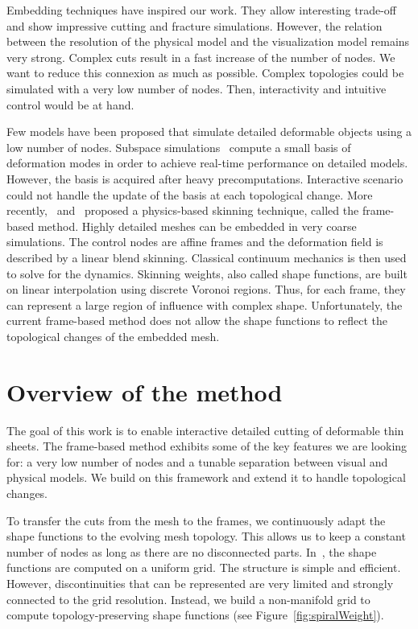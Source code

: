Embedding techniques have inspired our work. They allow interesting trade-off and show impressive cutting and fracture simulations. However, the relation between the resolution of the physical model and the visualization model remains very strong. Complex cuts result in a fast increase of the number of nodes. We want to reduce this connexion as much as possible. Complex topologies could be simulated with a very low number of nodes. Then, interactivity and intuitive control would be at hand.

Few models have been proposed that simulate detailed deformable objects using a low number of nodes. 
Subspace simulations~\cite{Barbic:2005:RTSI} compute a small basis of deformation modes in order to achieve real-time performance on detailed models. 
However, the basis is acquired after heavy precomputations. 
Interactive scenario could not handle the update of the basis at each topological change. 
More recently,~\cite{Gilles2011} and~\cite{Faure2011} proposed a physics-based skinning technique, called the frame-based method. 
Highly detailed meshes can be embedded in very coarse simulations. 
The control nodes are affine frames and the deformation field is described by a linear blend skinning. 
Classical continuum mechanics is then used to solve for the dynamics. 
Skinning weights, also called shape functions, are built on linear interpolation using discrete Voronoi regions. 
Thus, for each frame, they can represent a large region of influence with complex shape. 
Unfortunately, the current frame-based method does not allow the shape functions to reflect the topological changes of the embedded mesh.

\section{Overview of the method}

The goal of this work is to enable interactive detailed cutting of deformable thin sheets. 
The frame-based method exhibits some of the key features we are looking for: a very low number of nodes and a tunable separation between visual and physical models.  
We build on this framework and extend it to handle topological changes.

To transfer the cuts from the mesh to the frames, we continuously adapt the shape functions to the evolving mesh topology. 
This allows us to keep a constant number of nodes as long as there are no disconnected parts. 
In~\cite{Faure2011}, the shape functions are computed on a uniform grid.
The structure is simple and efficient. 
However, discontinuities that can be represented are very limited and strongly connected to the grid resolution. 
Instead, we build a non-manifold grid to compute topology-preserving shape functions (see Figure~\ref{fig:spiralWeight}).

